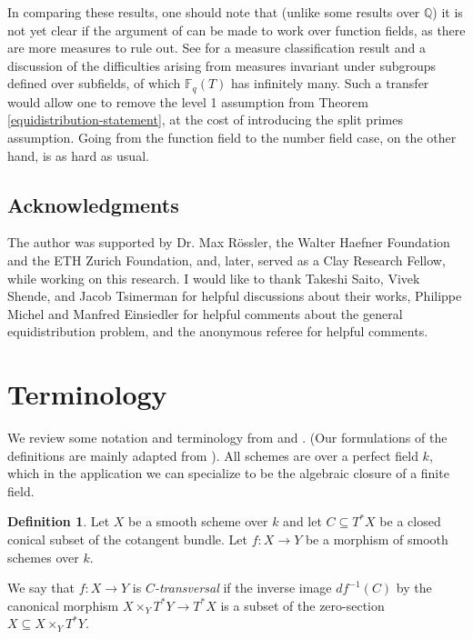 \documentclass[12pt]{amsart}
\theoremstyle{definition}
\newtheorem{definition}[theorem]{Definition}
\theoremstyle{remark}
\begin{document}
In comparing these results, one should note that (unlike some results over $\mathbb Q$) it is not yet clear if the argument of \citet{Khayutin} can be made to work over function fields, as there are more measures to rule out. See \citep*[Theorem 1.2 and \S1.3]{ELM} for a measure classification result and a discussion of the difficulties arising from measures invariant under subgroups defined over subfields, of which $\mathbb F_q(T)$ has infinitely many. Such a transfer would allow one to remove the level 1 assumption from Theorem \ref{equidistribution-statement}, at the cost of introducing the split primes assumption. Going from the function field to the number field case, on the other hand, is as hard as usual.



\subsection{Acknowledgments}

The author was supported by Dr. Max R\"{o}ssler, the Walter Haefner Foundation and the ETH Zurich Foundation, and, later, served as a Clay Research Fellow, while working on this research. I would like to thank Takeshi Saito, Vivek Shende, and Jacob Tsimerman for helpful discussions about their works, Philippe Michel and Manfred Einsiedler for helpful comments about the general equidistribution problem, and the anonymous referee for helpful comments.



\section{Terminology}

We review some notation and terminology from \cite{Beilinson} and \cite{saito1}. (Our formulations of the definitions are mainly adapted from \cite{saito1}). All schemes are over a perfect field $k$, which in the application we can specialize to be the algebraic closure of a finite field.

\begin{definition}\label{C-transversal-1} \cite[Definition 3.5(1)]{saito1} Let $X$ be a smooth scheme over $k$ and let $C \subseteq T^* X$ be a closed conical subset of the cotangent bundle. Let $f: X\to Y$ be a morphism of smooth schemes over $k$.

We say that $f: X \to Y$ is \emph{$C$-transversal} if the inverse image $df^{-1}(C)$ by the canonical morphism $X \times_Y T^* Y \to T^* X$ is a subset of the zero-section $X \subseteq X \times_Y T^* Y$.
\end{definition}
\end{document}
